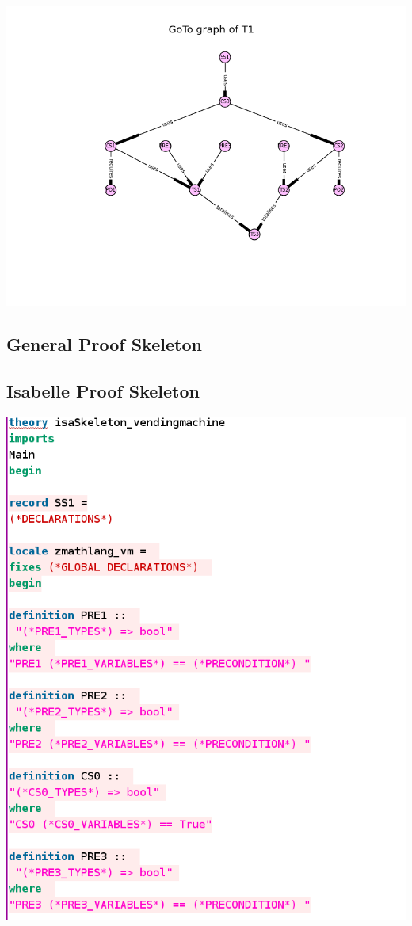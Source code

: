 \includegraphics[scale=0.7]{examples/vm/25b.png}
\subsection{General Proof Skeleton}
\label{app:vm3}

\subsection{Isabelle Proof Skeleton}
\label{app:vm4}
\includegraphics[scale=0.5]{examples/vm/4imagea.png}

